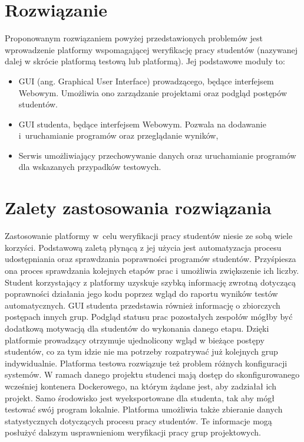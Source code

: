 \section {Rozwiązanie}

Proponowanym rozwiązaniem powyżej przedstawionych problemów jest wprowadzenie platformy wspomagającej weryfikację pracy studentów (nazywanej dalej w skrócie platformą testową lub platformą).
Jej podstawowe moduły to:
\begin{itemize}
    \item GUI (ang. Graphical User Interface) prowadzącego, będące interfejsem Webowym. Umożliwia ono zarządzanie projektami oraz podgląd postępów studentów.
    \item GUI studenta, będące interfejsem Webowym. Pozwala na dodawanie i~uruchamianie programów oraz przeglądanie wyników,
    \item Serwis umożliwiający przechowywanie danych oraz uruchamianie programów dla wskazanych przypadków testowych.
\end{itemize}

\section{Zalety zastosowania rozwiązania}

Zastosowanie platformy w~celu weryfikacji pracy studentów niesie ze sobą wiele korzyści.
Podstawową zaletą płynącą z jej użycia jest automatyzacja procesu udostępniania oraz sprawdzania poprawności programów studentów.
Przyśpiesza ona proces sprawdzania kolejnych etapów prac i umożliwia zwiększenie ich liczby.
Student korzystający z platformy uzyskuje szybką informację zwrotną dotyczącą poprawności działania jego kodu poprzez wgląd do raportu wyników testów automatycznych.
GUI studenta przedstawia również informację o zbiorczych postępach innych grup.
Podgląd statusu prac pozostałych zespołów mógłby być dodatkową motywacją dla studentów do wykonania danego etapu.
Dzięki platformie prowadzący otrzymuje ujednolicony wgląd w bieżące postępy studentów, co za tym idzie nie ma potrzeby rozpatrywać już kolejnych grup indywidualnie.
Platforma testowa rozwiązuje też problem różnych konfiguracji systemów.
W ramach danego projektu studenci mają dostęp do skonfigurowanego wcześniej kontenera Dockerowego, na którym żądane jest, aby zadziałał ich projekt.
Samo środowisko jest wyeksportowane dla studenta, tak aby mógł testować swój program lokalnie.
Platforma umożliwia także zbieranie danych statystycznych dotyczących procesu pracy studentów.
Te informacje mogą posłużyć dalszym usprawnieniom weryfikacji pracy grup projektowych.
